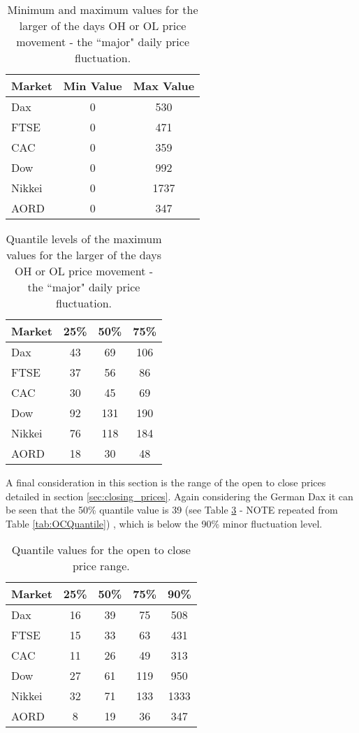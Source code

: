 \begin{table}[!h] \centering 
  \caption[Major daily price fluctuation.]{Minimum and maximum values for the larger of the days OH or OL price movement - the \textquotedblleft major" daily price fluctuation.} 
  \label{tab:majorOH}
\begin{tabular}{lcc} 
\toprule 
Market & Min Value & Max Value  \\ 
\midrule
Dax  & 0 & 530  \\ 
FTSE & 0 & 471  \\ 
CAC  & 0 & 359  \\ 
Dow  & 0 & 992  \\ 
Nikkei & 0 & 1737  \\ 
AORD   & 0 & 347 \\ 
\bottomrule
\end{tabular} 
\end{table} 

\begin{table}[!htbp] \centering 
  \caption[Quantiles of Major daily price fluctuation.]{Quantile levels of the maximum values for the larger of the days OH or OL price movement - the \textquotedblleft major" daily price fluctuation.} 
  \label{tab:majorOHQ}
\begin{tabular}{lccc} 
\toprule 
Market & 25\% & 50\% & 75\% \\ 
\midrule
Dax  & 43  & 69 & 106  \\ 
FTSE & 37  & 56 & 86  \\ 
CAC  & 30  & 45 & 69  \\ 
Dow  & 92 & 131  & 190  \\ 
Nikkei & 76  & 118  & 184  \\ 
AORD   & 18  & 30  & 48 \\ 
\bottomrule
\end{tabular} 
\end{table} 

A final consideration in this section is the range of the open to close prices detailed in section \ref{sec:closing_prices}. Again considering the German Dax it can be seen that the 50\% quantile value is 39 (see Table \ref{tab:OCQuantile2} - NOTE repeated from Table \ref{tab:OCQuantile}) , which is below the 90\% minor fluctuation level.

\begin{table}[!htbp] \centering 
  \caption[Quantiles of the open to close price range.]{Quantile values for the open to close price range.} 
  \label{tab:OCQuantile2}
\begin{tabular}{lcccc} 
\toprule 
Market & 25\% & 50\% & 75\% & 90\% \\ 
\midrule
Dax  & 16  & 39 & 75 & 508  \\ 
FTSE & 15  & 33 & 63 & 431 \\ 
CAC  & 11  & 26 & 49 & 313 \\ 
Dow  & 27 & 61  & 119 & 950 \\ 
Nikkei & 32  & 71  & 133 & 1333 \\ 
AORD   & 8  & 19  & 36 & 347 \\ 
\bottomrule
\end{tabular} 
\end{table} 

